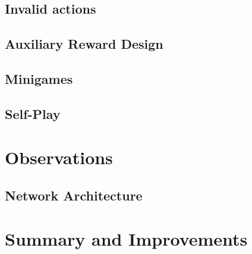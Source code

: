 \documentclass[12pt]{article}
\begin{document}
\subsection{Invalid actions\johannes} %

\subsection{Auxiliary Reward Design\johannes}

\subsection{Minigames\johannes} %

\subsection{Self-Play\johannes} %



\section{Observations}
\subsection{Network Architecture\johannes}




\section{Summary and Improvements\johannes}




\printbibliography
\end{document}
